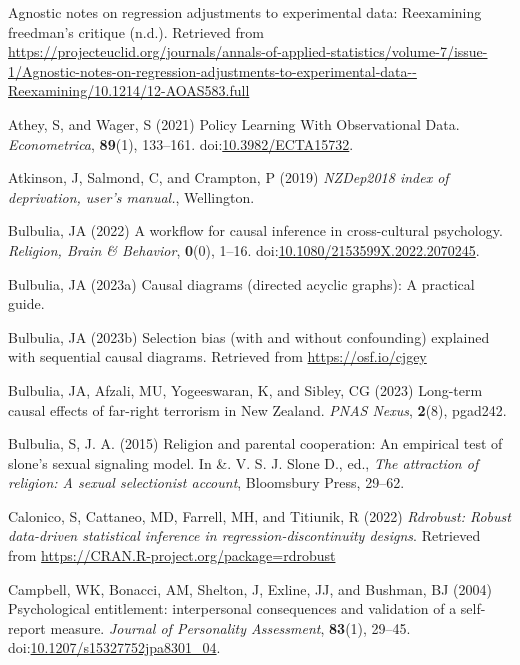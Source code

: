 \documentclass[
  singlecolumn]{article}
\newlength{\cslhangindent}
\newenvironment{CSLReferences}[2] %
 {\begin{list}{}{%
  \setlength{\itemindent}{0pt}
  \setlength{\leftmargin}{0pt}
  \setlength{\parsep}{0pt}
  \ifodd #1
   \setlength{\leftmargin}{\cslhangindent}
   \setlength{\itemindent}{-1\cslhangindent}
  \fi
  \setlength{\itemsep}{#2\baselineskip}}}
 {\end{list}}
\begin{document}
\label{refs}
\begin{CSLReferences}{1}{0}
Agnostic notes on regression adjustments to experimental data:
Reexamining freedman{'}s critique (n.d.). Retrieved from
\url{https://projecteuclid.org/journals/annals-of-applied-statistics/volume-7/issue-1/Agnostic-notes-on-regression-adjustments-to-experimental-data--Reexamining/10.1214/12-AOAS583.full}

Athey, S, and Wager, S (2021) Policy Learning With Observational Data.
\emph{Econometrica}, \textbf{89}(1), 133--161.
doi:\href{https://doi.org/10.3982/ECTA15732}{10.3982/ECTA15732}.

Atkinson, J, Salmond, C, and Crampton, P (2019) \emph{NZDep2018 index of
deprivation, user{'}s manual.}, Wellington.

Bulbulia, JA (2022) A workflow for causal inference in cross-cultural
psychology. \emph{Religion, Brain \& Behavior}, \textbf{0}(0), 1--16.
doi:\href{https://doi.org/10.1080/2153599X.2022.2070245}{10.1080/2153599X.2022.2070245}.

Bulbulia, JA (2023a) Causal diagrams (directed acyclic graphs): A
practical guide.

Bulbulia, JA (2023b) Selection bias (with and without confounding)
explained with sequential causal diagrams. Retrieved from
\url{https://osf.io/cjgey}

Bulbulia, JA, Afzali, MU, Yogeeswaran, K, and Sibley, CG (2023)
Long-term causal effects of far-right terrorism in {N}ew {Z}ealand.
\emph{PNAS Nexus}, \textbf{2}(8), pgad242.

Bulbulia, S, J. A. (2015) Religion and parental cooperation: An
empirical test of slone's sexual signaling model. In \&. V. S. J. Slone
D., ed., \emph{The attraction of religion: A sexual selectionist
account}, Bloomsbury Press, 29--62.

Calonico, S, Cattaneo, MD, Farrell, MH, and Titiunik, R (2022)
\emph{Rdrobust: Robust data-driven statistical inference in
regression-discontinuity designs}. Retrieved from
\url{https://CRAN.R-project.org/package=rdrobust}

Campbell, WK, Bonacci, AM, Shelton, J, Exline, JJ, and Bushman, BJ
(2004) Psychological entitlement: interpersonal consequences and
validation of a self-report measure. \emph{Journal of Personality
Assessment}, \textbf{83}(1), 29--45.
doi:\href{https://doi.org/10.1207/s15327752jpa8301_04}{10.1207/s15327752jpa8301\_04}.


\end{CSLReferences}
\end{document}
